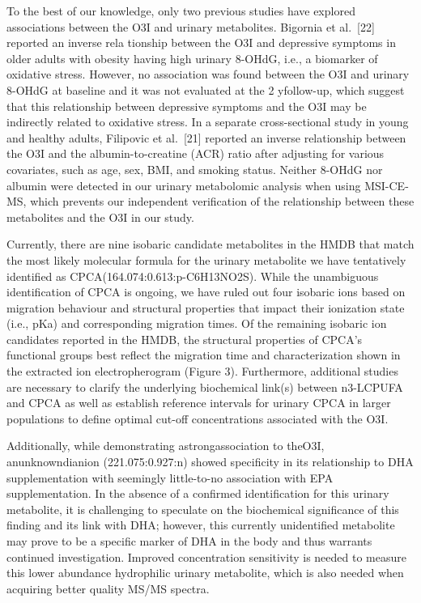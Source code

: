 \documentclass[journal=jacsat,manuscript=article]{achemso}
\begin{document}
To the best of our knowledge, only two previous studies have explored
associations between the O3I and urinary metabolites. Bigornia et
al.~{[}22{]} reported an inverse rela tionship between the O3I and
depressive symptoms in older adults with obesity having high urinary
8-OHdG, i.e., a biomarker of oxidative stress. However, no association
was found between the O3I and urinary 8-OHdG at baseline and it was not
evaluated at the 2 yfollow-up, which suggest that this relationship
between depressive symptoms and the O3I may be indirectly related to
oxidative stress. In a separate cross-sectional study in young and
healthy adults, Filipovic et al.~{[}21{]} reported an inverse
relationship between the O3I and the albumin-to-creatine (ACR) ratio
after adjusting for various covariates, such as age, sex, BMI, and
smoking status. Neither 8-OHdG nor albumin were detected in our urinary
metabolomic analysis when using MSI-CE-MS, which prevents our
independent verification of the relationship between these metabolites
and the O3I in our study.

Currently, there are nine isobaric candidate metabolites in the HMDB
that match the most likely molecular formula for the urinary metabolite
we have tentatively identified as CPCA(164.074:0.613:p-C6H13NO2S). While
the unambiguous identification of CPCA is ongoing, we have ruled out
four isobaric ions based on migration behaviour and structural
properties that impact their ionization state (i.e., pKa) and
corresponding migration times. Of the remaining isobaric ion candidates
reported in the HMDB, the structural properties of CPCA's functional
groups best reflect the migration time and characterization shown in the
extracted ion electropherogram (Figure 3). Furthermore, additional
studies are necessary to clarify the underlying biochemical link(s)
between n3-LCPUFA and CPCA as well as establish reference intervals for
urinary CPCA in larger populations to define optimal cut-off
concentrations associated with the O3I.

Additionally, while demonstrating astrongassociation to theO3I,
anunknowndianion (221.075:0.927:n) showed specificity in its
relationship to DHA supplementation with seemingly little-to-no
association with EPA supplementation. In the absence of a confirmed
identification for this urinary metabolite, it is challenging to
speculate on the biochemical significance of this finding and its link
with DHA; however, this currently unidentified metabolite may prove to
be a specific marker of DHA in the body and thus warrants continued
investigation. Improved concentration sensitivity is needed to measure
this lower abundance hydrophilic urinary metabolite, which is also
needed when acquiring better quality MS/MS spectra.
\end{document}
